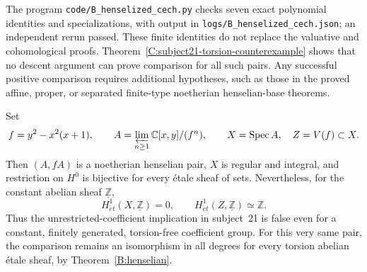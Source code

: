 The program \texttt{code/B\_henselized\_cech.py} checks seven
exact polynomial identities and specializations, with output in
\texttt{logs/B\_henselized\_cech.json}; an independent rerun
passed. These finite identities do not replace the valuative
and cohomological proofs. Theorem~\ref{C:subject21-torsion-counterexample}
shows that no descent argument can prove comparison for all such
pairs. Any successful positive comparison requires additional
hypotheses, such as those in the proved affine, proper, or separated
finite-type noetherian henselian-base theorems.

\begin{proposition}\label{B:constant-integer-rigidity}
Set
\[
 f=y^2-x^2(x+1),\qquad
 A=\varprojlim_{n\geq1}\mathbb C[x,y]/(f^n),\qquad
 X=\operatorname{Spec}A,\quad Z=V(f)\subset X.
\]
Then $(A,fA)$ is a noetherian henselian pair, $X$ is regular and
integral, and restriction on $H^0$ is bijective for every \'etale
sheaf of sets. Nevertheless, for the constant abelian sheaf
$\underline{\mathbb Z}$,
\[
 H^1_{\acute et}(X,\underline{\mathbb Z})=0,
 \qquad
 H^1_{\acute et}(Z,\underline{\mathbb Z})\simeq\mathbb Z.
\]
Thus the unrestricted-coefficient implication in subject~21 is
false even for a constant, finitely generated, torsion-free
coefficient group. For this very same pair, the comparison remains
an isomorphism in all degrees for every torsion abelian \'etale
sheaf, by Theorem~\ref{B:henselian}.
\end{proposition}
